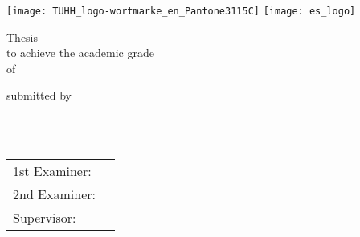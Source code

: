 
\begin{titlepage}
	\texttt{[image: TUHH\_logo-wortmarke\_en\_Pantone3115C]}\hfill
	\texttt{[image: es\_logo]}
	\vfill

	\begin{center}
		{\Huge\color{TUHHdarkblue}\textbf{\thetitle}\par}

		\vfill
		{\Large{\degree} Thesis \\ to achieve the academic grade \\ \degree\space of \type\par}

		\vfill
		submitted by \\[5pt]
		{\Large\theauthor}\par
		{\studentnumber}\par

		\vfill
		{\Large\faculty\\\university\\[20pt]\monthname\space\year}
	\end{center}

	\vfill\noindent
	\begin{tabular}{ll}
		1st Examiner:   & \fstReviewer \\
		2nd Examiner:   & \sndReviewer \\
		Supervisor:        & \supervisor
	\end{tabular}
\end{titlepage}
